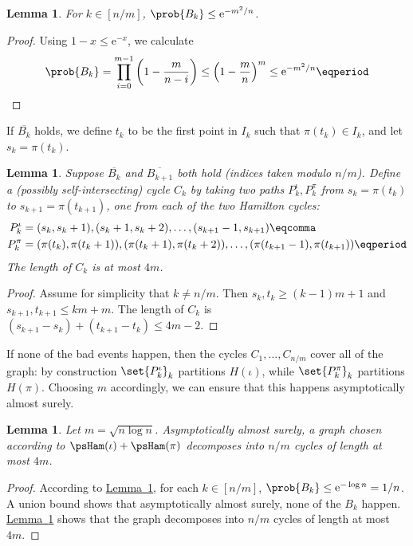 \documentclass[11pt]{article}
\numberwithin{equation}{section}
\newtheorem{lemma}[theorem]{Lemma}
\theoremstyle{definition}
\theoremstyle{plain}
\newcommand{\eee}{\mathrm e}
\newcommand{\expref}[2]{\hyperref[#2]{#1~\ref{#2}}}
\begin{document}
\begin{lemma} \label{lem:b-prob}
 For $k \in [n/m]$, $\prob{B_k} \leq \eee^{-m^2/n}$.
\end{lemma}
\begin{proof}
 Using $1-x \leq \eee^{-x}$, we calculate
\begin{equation}
 \prob{B_k} = \prod_{i=0}^{m-1} \left(1 - \frac{m}{n-i}\right) \leq \left(1 - \frac{m}{n}\right)^m \leq \eee^{-m^2/n} \eqperiod \qedhere
\end{equation}
\end{proof}

If $\overline{B_k}$ holds, we define $t_k$ to be the first point in $I_k$ such that $\pi(t_k) \in I_k$, and let $s_k = \pi(t_k)$.

\begin{lemma} \label{lem:cycle}
 Suppose $\overline{B_k}$ and $\overline{B_{k+1}}$ both hold (indices taken modulo $n/m$). Define a (possibly self-intersecting) cycle $C_k$ by taking two paths $P_k^\iota,P_k^\pi$ from $s_k = \pi(t_k)$ to $s_{k+1} = \pi(t_{k+1})$, one from each of the two Hamilton cycles:
\begin{align*}
 P_k^\iota &= (s_k,s_k+1),(s_k+1,s_k+2),\ldots,(s_{k+1}-1,s_{k+1}) \eqcomma \\
 P_k^\pi &= (\pi(t_k),\pi(t_k+1)),(\pi(t_k+1),\pi(t_k+2)),\ldots,(\pi(t_{k+1}-1),\pi(t_{k+1})) \eqperiod
\end{align*}
 The length of $C_k$ is at most $4m$.
\end{lemma}
\begin{proof}
 Assume for simplicity that $k \neq n/m$. Then $s_k,t_k \geq (k-1)m + 1$ and $s_{k+1},t_{k+1} \leq km + m$. The length of $C_k$ is $(s_{k+1} - s_k) + (t_{k+1} - t_k) \leq 4m-2$.
\end{proof}

If none of the bad events happen, then the cycles $C_1,\ldots,C_{n/m}$ cover all of the graph: by construction $\set{P_k^\iota}_k$ partitions $H(\iota)$, while $\set{P_k^\pi}_k$ partitions $H(\pi)$. Choosing $m$ accordingly, we can ensure that this happens asymptotically almost surely.

\begin{lemma} \label{lem:partition}
 Let $m = \sqrt{n\log n}$. Asymptotically almost surely, a graph chosen according to $\psHam(\iota) + \psHam(\pi)$ decomposes into $n/m$ cycles of %
 length at most $4m$.
\end{lemma}
\begin{proof}
 According to \expref{Lemma}{lem:b-prob}, for each $k \in [n/m]$, $\prob{B_k} \leq \eee^{-\log n} = 1/n$. A union bound shows that asymptotically almost surely, none of the $B_k$ happen. \expref{Lemma}{lem:cycle} shows that the graph decomposes into $n/m$ cycles of %
 length at most $4m$.
\end{proof}
\end{document}
